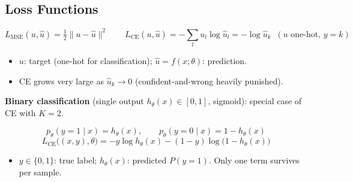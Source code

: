 \documentclass[10pt,a4paper]{article}
\begin{document}
	\begin{center}
	\end{center}

	\subsection{Loss Functions}

	\begin{formulabox}
		\[
		L_{\mathrm{MSE}}(u,\hat u)=\tfrac{1}{2}\lVert u-\hat u\rVert^2
		\qquad
		L_{\mathrm{CE}}(u,\hat u)=-\sum_l u_l\log\hat u_l = -\log \hat u_k \;\;(\text{$u$ one-hot, }y{=}k)
		\]
	\end{formulabox}
	\begin{itemize}[leftmargin=*]
		\item $u$: target (one-hot for classification); \quad $\hat u=f(x;\theta)$: prediction.
		\item CE grows very large as $\hat u_k\to 0$ (confident-and-wrong heavily punished).
	\end{itemize}

	\textbf{Binary classification} (single output $h_\theta(x)\in[0,1]$, sigmoid): special case of CE with $K{=}2$.
	\begin{formulabox}
		\[
		p_\theta(y{=}1\mid x)=h_\theta(x), \qquad p_\theta(y{=}0\mid x)=1-h_\theta(x)
		\]
		\[
		L_{\mathrm{CE}}\big((x,y),\theta\big)=-y\log h_\theta(x)-(1-y)\log\big(1-h_\theta(x)\big)
		\]
	\end{formulabox}
	\begin{itemize}[leftmargin=*]
		\item $y\in\{0,1\}$: true label; \quad $h_\theta(x)$: predicted $P(y{=}1)$. Only one term survives per sample.
	\end{itemize}
\end{document}
